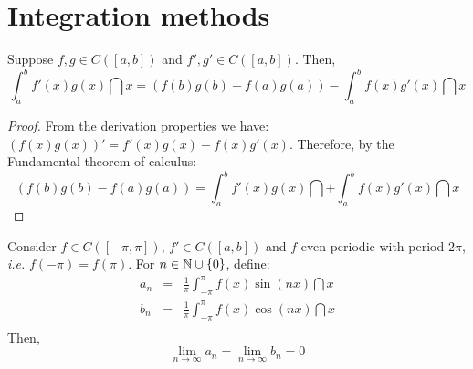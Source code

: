 \section{Integration methods}

\begin{theorem}
    Suppose $f, g \in C([a,b])$ and $f', g' \in C([a,b])$. Then,
    \begin{equation*}
        \int_a^b f'(x)g(x) \dint x = (f(b)g(b) - f(a)g(a)) - \int_a^b f(x) g'(x) \dint x
    \end{equation*}
\end{theorem}

\begin{proof}
    From the derivation properties we have: $(f(x)g(x))' = f'(x)g(x) - f(x)g'(x)$. Therefore, by the Fundamental theorem of calculus:
    \begin{equation*}
        (f(b)g(b) - f(a)g(a)) = \int_a^b f'(x)g(x) \dint + \int_a^b f(x)g'(x) \dint x
    \end{equation*}
\end{proof}

\begin{lemma}
    Consider $f \in C([-\pi, \pi])$, $f' \in C([a,b])$ and $f$ even periodic with period $2 \pi$, \emph{i.e.} $f(-\pi) = f(\pi)$. For $n \in \mathbb{N} \cup \{0\}$, define:
    \begin{eqnarray*}
        a_n &=& \frac{1}{\pi} \int_{-\pi}^\pi f(x) \sin(n x) \dint x \\
        b_n &=& \frac{1}{\pi} \int_{-\pi}^\pi f(x) \cos(n x) \dint x \\
    \end{eqnarray*}
    Then,
    \begin{equation*}
        \lim \limits_{n \to \infty} a_n  = \lim \limits_{n \to \infty} b_n  = 0
    \end{equation*}
\end{lemma}

